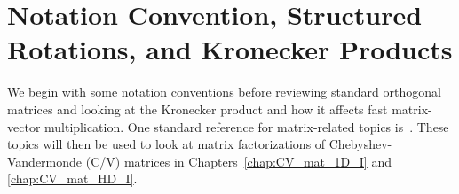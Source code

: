 \chapter{Notation Convention, Structured Rotations, and Kronecker Products}
\label{chap:K_and_R}

We begin with some notation conventions before reviewing
standard orthogonal matrices and
looking at the Kronecker product and how it affects fast matrix-vector
multiplication. One standard reference for matrix-related topics is~\cite{gvl4}.
These topics will then be used to look at
matrix factorizations of Chebyshev-Vandermonde (C\=/V) matrices
in Chapters~\ref{chap:CV_mat_1D_I} and \ref{chap:CV_mat_HD_I}.







